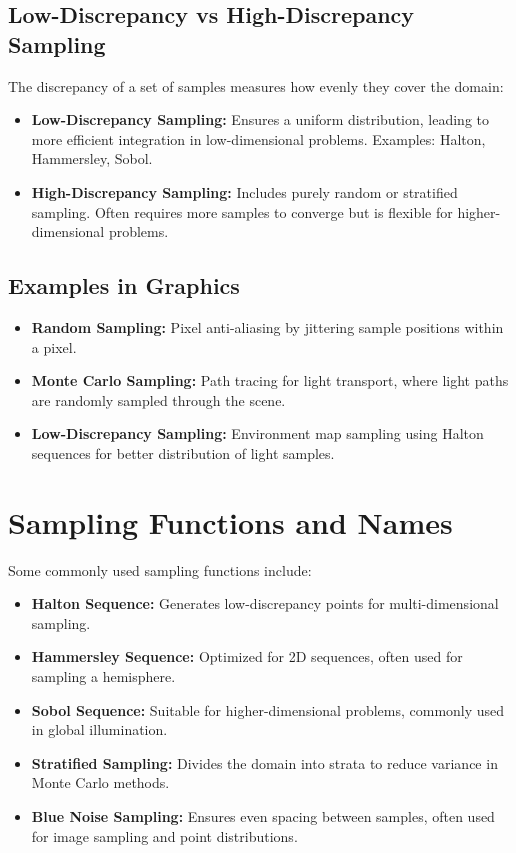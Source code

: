 \documentclass{article}
\begin{document}
\subsection{Low-Discrepancy vs High-Discrepancy Sampling}
The discrepancy of a set of samples measures how evenly they cover the domain:
\begin{itemize}
    \item \textbf{Low-Discrepancy Sampling:} Ensures a uniform distribution, leading to more efficient integration in low-dimensional problems. Examples: Halton, Hammersley, Sobol.
    \item \textbf{High-Discrepancy Sampling:} Includes purely random or stratified sampling. Often requires more samples to converge but is flexible for higher-dimensional problems.
\end{itemize}

\subsection{Examples in Graphics}
\begin{itemize}
    \item \textbf{Random Sampling:} Pixel anti-aliasing by jittering sample positions within a pixel.
    \item \textbf{Monte Carlo Sampling:} Path tracing for light transport, where light paths are randomly sampled through the scene.
    \item \textbf{Low-Discrepancy Sampling:} Environment map sampling using Halton sequences for better distribution of light samples.
\end{itemize}

\section{Sampling Functions and Names}
Some commonly used sampling functions include:
\begin{itemize}
    \item \textbf{Halton Sequence:} Generates low-discrepancy points for multi-dimensional sampling.
    \item \textbf{Hammersley Sequence:} Optimized for 2D sequences, often used for sampling a hemisphere.
    \item \textbf{Sobol Sequence:} Suitable for higher-dimensional problems, commonly used in global illumination.
    \item \textbf{Stratified Sampling:} Divides the domain into strata to reduce variance in Monte Carlo methods.
    \item \textbf{Blue Noise Sampling:} Ensures even spacing between samples, often used for image sampling and point distributions.
\end{itemize}
\end{document}
